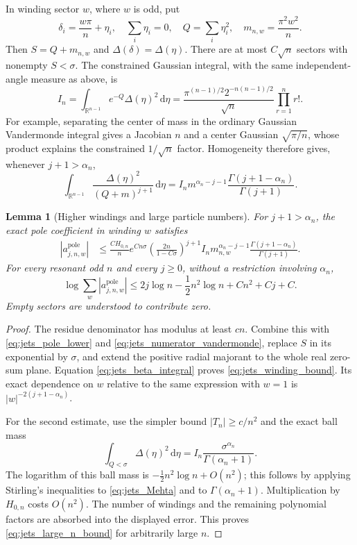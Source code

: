 \documentclass[11pt]{article}
\numberwithin{equation}{section}
\newtheorem{lemma}[theorem]{Lemma}
\theoremstyle{definition}
\newcommand{\R}{\mathbb R}
\newcommand{\dd}{\,\mathrm d}
\begin{document}
In winding sector $w$, where $w$ is odd, put
\[
 \delta_i=\frac{w\pi}{n}+\eta_i,\quad
 \sum_i\eta_i=0,\quad Q=\sum_i\eta_i^2,\quad
 m_{n,w}=\frac{\pi^2w^2}{n}.
\]
Then $S=Q+m_{n,w}$ and $\Delta(\delta)=\Delta(\eta)$.
There are at most $C\sqrt n$ sectors with nonempty $S<\sigma$.
The constrained Gaussian integral, with the same independent-angle
measure as above, is
\begin{equation}\label{eq:jets_Mehta}
 I_n=\int_{\R^{n-1}}e^{-Q}\Delta(\eta)^2\dd\eta
 =\frac{\pi^{(n-1)/2}2^{-n(n-1)/2}}{\sqrt n}
   \prod_{r=1}^n r!.
\end{equation}
For example, separating the center of mass in the ordinary Gaussian
Vandermonde integral gives a Jacobian $n$ and a center Gaussian
$\sqrt{\pi/n}$, whose product explains the constrained
$1/\sqrt n$ factor. Homogeneity therefore gives, whenever
$j+1>\alpha_n$,
\begin{equation}\label{eq:jets_beta_integral}
 \int_{\R^{n-1}}\frac{\Delta(\eta)^2}{(Q+m)^{j+1}}\dd\eta
 =I_n m^{\alpha_n-j-1}
       \frac{\Gamma(j+1-\alpha_n)}{\Gamma(j+1)}.
\end{equation}

\begin{lemma}[Higher windings and large particle numbers]
\label{lem:jets_windings_large_n}
For $j+1>\alpha_n$, the exact pole coefficient in winding $w$
satisfies
\begin{align}
 |a_{j,n,w}^{\mathrm{pole}}|
 &\le \frac{C H_{0,n}}n e^{Cn\sigma}
 \left(\frac{2n}{1-C\sigma}\right)^{j+1}
 I_n m_{n,w}^{\alpha_n-j-1}
 \frac{\Gamma(j+1-\alpha_n)}{\Gamma(j+1)}.
 \label{eq:jets_winding_bound}
\end{align}
For every resonant odd $n$ and every $j\ge0$, without a restriction
involving $\alpha_n$,
\begin{equation}\label{eq:jets_large_n_bound}
 \log\sum_w|a_{j,n,w}^{\mathrm{pole}}|
 \le 2j\log n-\frac12n^2\log n+Cn^2+Cj+C.
\end{equation}
Empty sectors are understood to contribute zero.
\end{lemma}

\begin{proof}
The residue denominator has modulus at least $cn$. Combine this
with \eqref{eq:jets_pole_lower} and
\eqref{eq:jets_numerator_vandermonde}, replace $S$ in its exponential
by $\sigma$, and extend the positive radial majorant to the whole
real zero-sum plane. Equation \eqref{eq:jets_beta_integral} proves
\eqref{eq:jets_winding_bound}. Its exact dependence on $w$ relative
to the same expression with $w=1$ is
$|w|^{-2(j+1-\alpha_n)}$.

For the second estimate, use the simpler bound $|T_n|\ge c/n^2$
and the exact ball mass
\[
 \int_{Q<\sigma}\Delta(\eta)^2\dd\eta
 =I_n\frac{\sigma^{\alpha_n}}{\Gamma(\alpha_n+1)}.
\]
The logarithm of this ball mass is
$-\tfrac12n^2\log n+O(n^2)$; this follows by applying Stirling's
inequalities to \eqref{eq:jets_Mehta} and to
$\Gamma(\alpha_n+1)$. Multiplication by $H_{0,n}$ costs $O(n^2)$.
The number of windings and the remaining polynomial factors are
absorbed into the displayed error. This proves
\eqref{eq:jets_large_n_bound} for arbitrarily large $n$.
\end{proof}
\end{document}
